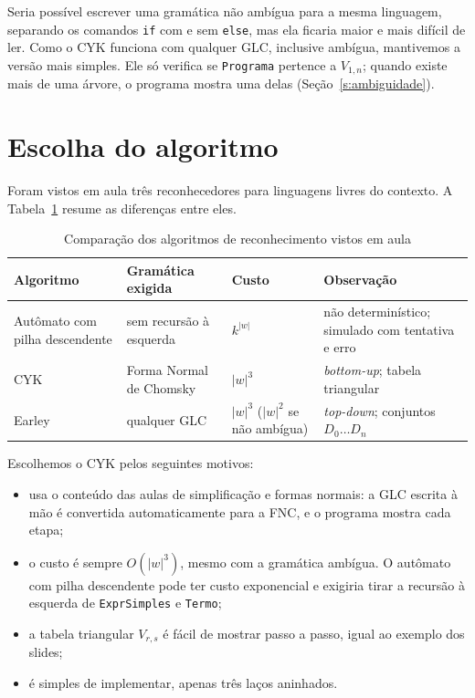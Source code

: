 \documentclass[12pt,a4paper]{article}
\newcommand{\fonte}[1][Elaborado pelos autores (2026).]{%
  \par\vspace{3pt}{\footnotesize Fonte: #1}\par}
\newcommand{\code}[1]{\texttt{#1}}
\begin{document}
Seria possível escrever uma gramática não ambígua para a mesma linguagem, separando os comandos
\code{if} com e sem \code{else}, mas ela ficaria maior e mais difícil de ler. Como o CYK funciona
com qualquer GLC, inclusive ambígua, mantivemos a versão mais simples. Ele só verifica se
\code{Programa} pertence a $V_{1,n}$; quando existe mais de uma árvore, o programa mostra uma
delas (Seção~\ref{s:ambiguidade}).

\section{Escolha do algoritmo}

Foram vistos em aula três reconhecedores para linguagens livres do contexto. A
Tabela~\ref{t:algoritmos} resume as diferenças entre eles.

\begin{table}[H]
\caption{Comparação dos algoritmos de reconhecimento vistos em aula}\label{t:algoritmos}
\centering\small
\begin{tabular}{@{}>{\raggedright}p{2.6cm}>{\raggedright}p{3.6cm}>{\raggedright}p{2.6cm}>{\raggedright\arraybackslash}p{4.8cm}@{}}
\toprule
Algoritmo & Gramática exigida & Custo & Observação \\
\midrule
Autômato com pilha descendente & sem recursão à esquerda & $k^{|w|}$ & não determinístico; simulado com tentativa e erro \\
CYK & Forma Normal de Chomsky & $|w|^3$ & \textit{bottom-up}; tabela triangular \\
Earley & qualquer GLC & $|w|^3$ ($|w|^2$ se não ambígua) & \textit{top-down}; conjuntos $D_0 \dots D_n$ \\
\bottomrule
\end{tabular}
\fonte
\end{table}

Escolhemos o CYK pelos seguintes motivos:

\begin{itemize}[nosep]
  \item usa o conteúdo das aulas de simplificação e formas normais: a GLC escrita à mão é
        convertida automaticamente para a FNC, e o programa mostra cada etapa;
  \item o custo é sempre $O(|w|^3)$, mesmo com a gramática ambígua. O autômato com pilha
        descendente pode ter custo exponencial e exigiria tirar a recursão à esquerda de
        \code{ExprSimples} e \code{Termo};
  \item a tabela triangular $V_{r,s}$ é fácil de mostrar passo a passo, igual ao exemplo dos slides;
  \item é simples de implementar, apenas três laços aninhados.
\end{itemize}
\end{document}
